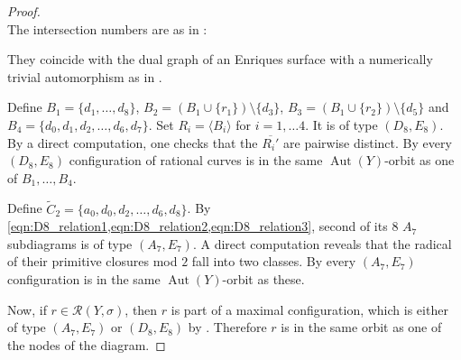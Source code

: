 \documentclass[a4paper]{amsart}
\theoremstyle{definition}
\theoremstyle{plain}
\DeclareMathOperator{\Aut}{Aut}
\newcommand{\R}{\mathcal{R}}
\begin{document}
\begin{proof}
\[\]
The intersection numbers are as in :
\begin{figure}[H]
\caption{}\label{figure:D8E8}
\end{figure}

They coincide with the dual graph of an Enriques surface with a numerically trivial automorphism as in \cite[8.2.23 (B)]{enriquesII}.

Define 
$B_1=\{d_1,\dots, d_8\}$,
$B_2 = (B_1\cup\{r_1\})\setminus \{d_3\}$, $B_3 = (B_1\cup\{r_2\})\setminus \{d_5\}$
and $B_4 = \{d_0,d_1,d_2,\dots,d_6,d_7\}$.
Set $R_i=\langle B_i \rangle$ for $i=1,\dots 4$. It is of type $(D_8,E_8)$. 
By a direct computation, one checks that the $\overline{R_i'}$ are pairwise distinct. 
By  every $(D_8,E_8)$ configuration of rational curves is in the same $\Aut(Y)$-orbit as one of $B_1,\dots, B_4$.

Define $\widetilde{C}_2=\{a_0,d_0,d_2,\dots,d_6, d_8\}$.
By \cref{eqn:D8_relation1,eqn:D8_relation2,eqn:D8_relation3}, second of its $8$ $A_7$ subdiagrams is of type $(A_7,E_7)$.
A direct computation reveals that the radical of their primitive closures mod $2$ fall into two classes. By  every $(A_7,E_7)$ configuration is in the same $\Aut(Y)$-orbit as these. 

Now, if $r \in \R(Y,\sigma)$, then $r$ is part of a maximal configuration, which is either of type $(A_7,E_7)$ or $(D_8,E_8)$
by . Therefore $r$ is in the same orbit as one of the nodes of the diagram.  


\end{proof}
\end{document}
